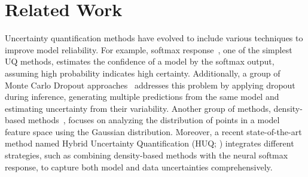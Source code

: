 \section{Related Work}

  Uncertainty quantification methods have evolved to include various techniques to improve model reliability. For example, softmax response~\cite{selective-classification}, one of the simplest UQ methods, estimates the confidence of a model by the softmax output, assuming high probability indicates high certainty. Additionally, a group of Monte Carlo Dropout approaches~\cite{pmlr-v48-gal16, kampffmeyer2016semantic, gal2017deep} addresses this problem by applying dropout during inference, generating multiple predictions from the same model and estimating uncertainty from their variability. Another group of methods, density-based methods~\cite{lee2018simple, yoo-etal-2022-detection, Mukhoti2022ddu, Kotelevskii2022nuq}, focuses on analyzing the distribution of points in a model feature space using the Gaussian distribution. Moreover, a recent state-of-the-art method named Hybrid Uncertainty Quantification (HUQ; \cite{vazhentsev-etal-2023-hybrid}) integrates different strategies, such as combining density-based methods with the neural softmax response, to capture both model and data uncertainties comprehensively.

